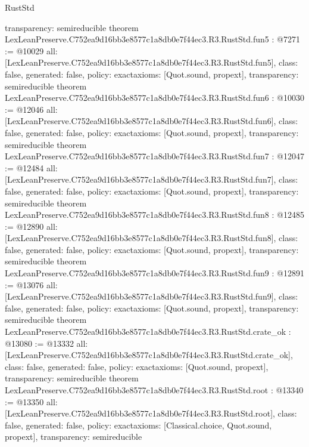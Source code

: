 \begin{lexlean}{RustStd}
\begin{coremodule}
{  transparency: semireducible
}
theorem LexLeanPreserve.C752ea9d16bb3e8577c1a8db0e7f44ec3.R3.RustStd.fun5 : @7271 := @10029 {
  all: [LexLeanPreserve.C752ea9d16bb3e8577c1a8db0e7f44ec3.R3.RustStd.fun5],
  class: false,
  generated: false,
  policy: exact{axioms: [Quot.sound, propext]},
  transparency: semireducible
}
theorem LexLeanPreserve.C752ea9d16bb3e8577c1a8db0e7f44ec3.R3.RustStd.fun6 : @10030 := @12046 {
  all: [LexLeanPreserve.C752ea9d16bb3e8577c1a8db0e7f44ec3.R3.RustStd.fun6],
  class: false,
  generated: false,
  policy: exact{axioms: [Quot.sound, propext]},
  transparency: semireducible
}
theorem LexLeanPreserve.C752ea9d16bb3e8577c1a8db0e7f44ec3.R3.RustStd.fun7 : @12047 := @12484 {
  all: [LexLeanPreserve.C752ea9d16bb3e8577c1a8db0e7f44ec3.R3.RustStd.fun7],
  class: false,
  generated: false,
  policy: exact{axioms: [Quot.sound, propext]},
  transparency: semireducible
}
theorem LexLeanPreserve.C752ea9d16bb3e8577c1a8db0e7f44ec3.R3.RustStd.fun8 : @12485 := @12890 {
  all: [LexLeanPreserve.C752ea9d16bb3e8577c1a8db0e7f44ec3.R3.RustStd.fun8],
  class: false,
  generated: false,
  policy: exact{axioms: [Quot.sound, propext]},
  transparency: semireducible
}
theorem LexLeanPreserve.C752ea9d16bb3e8577c1a8db0e7f44ec3.R3.RustStd.fun9 : @12891 := @13076 {
  all: [LexLeanPreserve.C752ea9d16bb3e8577c1a8db0e7f44ec3.R3.RustStd.fun9],
  class: false,
  generated: false,
  policy: exact{axioms: [Quot.sound, propext]},
  transparency: semireducible
}
theorem LexLeanPreserve.C752ea9d16bb3e8577c1a8db0e7f44ec3.R3.RustStd.crate_ok : @13080 := @13332 {
  all: [LexLeanPreserve.C752ea9d16bb3e8577c1a8db0e7f44ec3.R3.RustStd.crate_ok],
  class: false,
  generated: false,
  policy: exact{axioms: [Quot.sound, propext]},
  transparency: semireducible
}
theorem LexLeanPreserve.C752ea9d16bb3e8577c1a8db0e7f44ec3.R3.RustStd.root : @13340 := @13350 {
  all: [LexLeanPreserve.C752ea9d16bb3e8577c1a8db0e7f44ec3.R3.RustStd.root],
  class: false,
  generated: false,
  policy: exact{axioms: [Classical.choice, Quot.sound, propext]},
  transparency: semireducible
}


\end{coremodule}
\end{lexlean}
